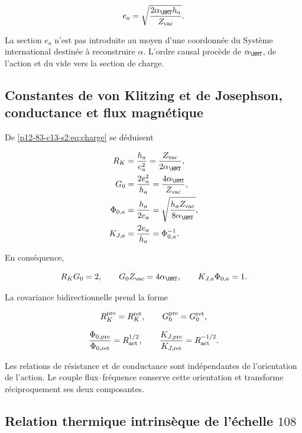 \begin{equation}
e_a=\sqrt{\frac{2\alpha_{\HMT}h_a}{Z_{\rm vac}}}.
\label{p12-83-c13-s2:eq:charge}
\end{equation}

La section \(e_a\) n'est pas introduite au moyen d'une coordonnée du Système
international destinée à reconstruire \(\alpha\). L'ordre causal procède de
\(\alpha_{\HMT}\), de l'action et du vide vers la section de charge.

\subsection{Constantes de von Klitzing et de Josephson, conductance et flux magnétique}

De \cref{p12-83-c13-s2:eq:charge} se déduisent

\begin{align}
R_K&=\frac{h_a}{e_a^2}=\frac{Z_{\rm vac}}{2\alpha_{\HMT}},
\label{p12-83-c13-s2:eq:rk}\\
G_0&=\frac{2e_a^2}{h_a}=\frac{4\alpha_{\HMT}}{Z_{\rm vac}},
\label{p12-83-c13-s2:eq:g0}\\
\Phi_{0,a}&=\frac{h_a}{2e_a}
=\sqrt{\frac{h_aZ_{\rm vac}}{8\alpha_{\HMT}}},
\label{p12-83-c13-s2:eq:phi0}\\
K_{J,a}&=\frac{2e_a}{h_a}=\Phi_{0,a}^{-1}.
\label{p12-83-c13-s2:eq:kj}
\end{align}

En conséquence,

\begin{equation}
R_KG_0=2,\qquad G_0Z_{\rm vac}=4\alpha_{\HMT},
\qquad K_{J,a}\Phi_{0,a}=1.
\label{p12-83-c13-s2:eq:quantum-electrical-identities}
\end{equation}

La covariance bidirectionnelle prend la forme

\[
R_K^{\rm pre}=R_K^{\rm ret},\qquad
G_0^{\rm pre}=G_0^{\rm ret},
\]

\[
\frac{\Phi_{0,\rm pre}}{\Phi_{0,\rm ret}}=R_{\rm act}^{1/2},
\qquad
\frac{K_{J,\rm pre}}{K_{J,\rm ret}}=R_{\rm act}^{-1/2}.
\]

Les relations de résistance et de conductance sont indépendantes de
l'orientation de l'action. Le couple flux--fréquence conserve cette
orientation et transforme réciproquement ses deux composantes.

\subsection{Relation thermique intrinsèque de l'échelle \texorpdfstring{\(108\)}{108}}

